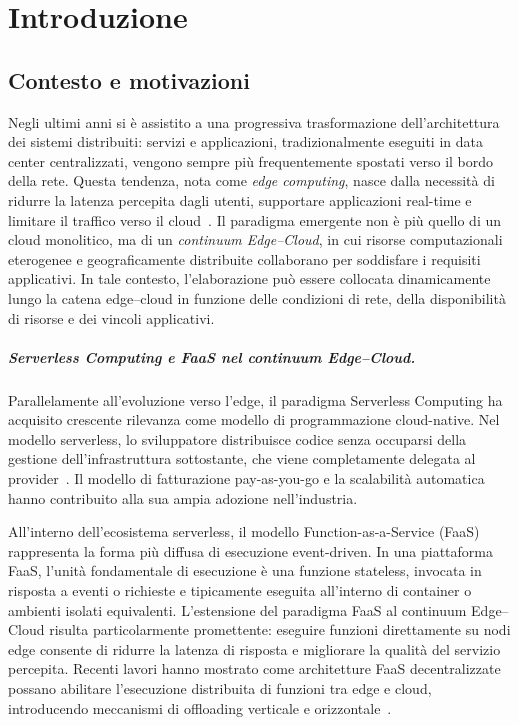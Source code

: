 \chapter{Introduzione}

\section{Contesto e motivazioni}

Negli ultimi anni si è assistito a una progressiva trasformazione dell'architettura dei
sistemi distribuiti: servizi e applicazioni, tradizionalmente eseguiti in data center
centralizzati, vengono sempre più frequentemente spostati verso il bordo della rete.
Questa tendenza, nota come \emph{edge computing}, nasce dalla necessità di ridurre la
latenza percepita dagli utenti, supportare applicazioni real-time e limitare il traffico
verso il cloud~\cite{Shi2016_EdgeVisionChallenges}.
Il paradigma emergente non è più quello di un cloud monolitico, ma di un
\emph{continuum Edge--Cloud}, in cui risorse computazionali eterogenee e
geograficamente distribuite collaborano per soddisfare i requisiti applicativi.
In tale contesto, l'elaborazione può essere collocata dinamicamente lungo la catena
edge--cloud in funzione delle condizioni di rete, della disponibilità di risorse e dei
vincoli applicativi.

\paragraph{Serverless Computing e FaaS nel continuum Edge--Cloud.}
Parallelamente all'evoluzione verso l'edge, il paradigma Serverless Computing ha
acquisito crescente rilevanza come modello di programmazione cloud-native.
Nel modello serverless, lo sviluppatore distribuisce codice senza occuparsi della
gestione dell'infrastruttura sottostante, che viene completamente delegata al
provider~\cite{VanEyk2018_ServerlessIsMore}.
Il modello di fatturazione pay-as-you-go e la scalabilità automatica hanno
contribuito alla sua ampia adozione nell'industria.

All'interno dell'ecosistema serverless, il modello Function-as-a-Service (FaaS)
rappresenta la forma più diffusa di esecuzione event-driven.
In una piattaforma FaaS, l'unità fondamentale di esecuzione è una funzione stateless,
invocata in risposta a eventi o richieste e tipicamente eseguita all'interno di container
o ambienti isolati equivalenti.
L'estensione del paradigma FaaS al continuum Edge--Cloud risulta particolarmente
promettente: eseguire funzioni direttamente su nodi edge consente di ridurre la latenza
di risposta e migliorare la qualità del servizio percepita.
Recenti lavori hanno mostrato come architetture FaaS decentralizzate possano abilitare
l'esecuzione distribuita di funzioni tra edge e cloud, introducendo meccanismi di
offloading verticale e orizzontale~\cite{Russo2023_Serverledge}.

